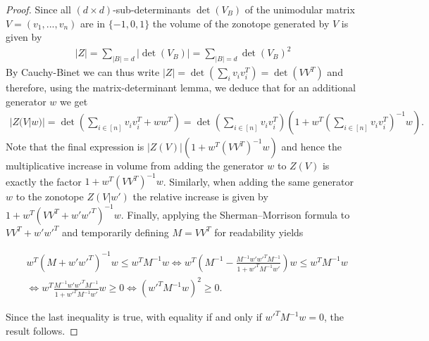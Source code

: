 \documentclass[10pt,a4paper]{amsart}
\begin{document}
\begin{proof}
    Since all $(d\times d)$-sub-determinants $\det(V_B)$ of the unimodular matrix $V=(v_1,...,v_n)$ are in $\{-1,0,1\}$ the volume of the zonotope generated by $V$ is given by 
    \begin{align*}
        |Z| = \sum_{|B|=d} | \det(V_B)|  =  \sum_{|B|=d}\det(V_B)^2
    \end{align*} 
    By Cauchy-Binet we can thus write $|Z| = \det({\sum_i v_iv_i^T}) = \det(VV^T)$ and therefore, using the matrix-determinant lemma, we deduce that for an additional generator $w$ we get
    \begin{align*}
        |Z(V|w)|= \det\left( \sum_{i \in [n]}v_i v_i^T + ww^T \right) = \det\left( \sum_{i \in [n]}v_i v_i^T\right) \left(1 + w^T \left(\sum_{i \in [n]}v_i v_i^T\right)^{-1} w  \right).
    \end{align*}
    Note that the final expression is $ |Z(V)|(1+w^T(VV^T)^{-1}w)$ and hence the multiplicative increase in volume from adding the generator $w$ to $Z(V)$ is exactly the factor $1+w^T(VV^T)^{-1}w$. Similarly, when adding the same generator $w$ to the zonotope $Z(V|w')$ the relative increase is given by $1 + w^T(VV^T + w'w'^T)^{-1}w$. Finally, applying the Sherman–Morrison formula to $VV^T + w'w'^T$ and temporarily defining $M = VV^T$ for readability yields
    
    \begin{align*}
        &w^T(M + w'w'^T)^{-1}w \leq w^TM^{-1}w  \iff w^T\left(M^{-1}- \frac{M^{-1}w'w'^TM^{-1}}{1 + w'^TM^{-1}w'}\right)w \leq w^TM^{-1}w\\
        &\iff w^T\frac{M^{-1}w'w'^TM^{-1}}{1 + w'^TM^{-1}w'}w \geq 0 \iff (w'^TM^{-1}w)^2 \geq 0.
    \end{align*}

    Since the last inequality is true, with equality if and only if $w'^TM^{-1}w = 0$, the result follows.
\end{proof}
\end{document}
